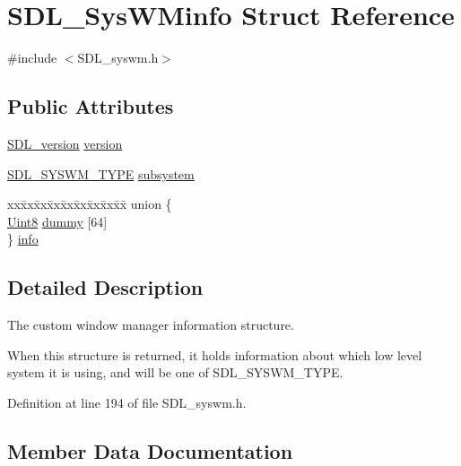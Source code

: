 \hypertarget{struct_s_d_l___sys_w_minfo}{}\section{S\+D\+L\+\_\+\+Sys\+W\+Minfo Struct Reference}
\label{struct_s_d_l___sys_w_minfo}


{\ttfamily \#include $<$S\+D\+L\+\_\+syswm.\+h$>$}

\subsection*{Public Attributes}
\begin{DoxyCompactItemize}
\item 
\mbox{\hyperlink{struct_s_d_l__version}{S\+D\+L\+\_\+version}} \mbox{\hyperlink{struct_s_d_l___sys_w_minfo_ac3a70af022d4849e9ff546595e94627f}{version}}
\item 
\mbox{\hyperlink{_s_d_l__syswm_8h_a064c26598287280fff2a00d6758ac4f7}{S\+D\+L\+\_\+\+S\+Y\+S\+W\+M\+\_\+\+T\+Y\+PE}} \mbox{\hyperlink{struct_s_d_l___sys_w_minfo_a438b6a06ab3ee417293c7b7fc5a23855}{subsystem}}
\item 
\begin{tabbing}
xx\=xx\=xx\=xx\=xx\=xx\=xx\=xx\=xx\=\kill
union \{\\
\>\mbox{\hyperlink{_s_d_l__stdinc_8h_a2944638813a090aa23e62f4da842c3e2}{Uint8}} \mbox{\hyperlink{struct_s_d_l___sys_w_minfo_a0e7fc58b98ae8317076e763fa94bc41f}{dummy}} \mbox{[}64\mbox{]}\\
\} \mbox{\hyperlink{struct_s_d_l___sys_w_minfo_a4e90cf02d24a53a9305948e167df83c6}{info}}\\

\end{tabbing}\end{DoxyCompactItemize}


\subsection{Detailed Description}
The custom window manager information structure.

When this structure is returned, it holds information about which low level system it is using, and will be one of S\+D\+L\+\_\+\+S\+Y\+S\+W\+M\+\_\+\+T\+Y\+PE. 

Definition at line 194 of file S\+D\+L\+\_\+syswm.\+h.



\subsection{Member Data Documentation}
\mbox{\label{struct_s_d_l___sys_w_minfo_a0e7fc58b98ae8317076e763fa94bc41f}} 
